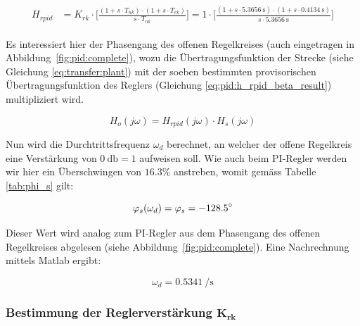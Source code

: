 \begin{gather} \label{eq:pid:h_rpid_beta_result}
    \begin{split}
        H_{rpid} & = K_{rk} \cdot \biggl[ \frac{(1 + s \cdot T_{nk}               ) \cdot (1 + s \cdot T_{vk}               ) }{ s \cdot T_{nk}               } \biggr]
                   = 1      \cdot \biggl[ \frac{(1 + s \cdot \SI{5.3656}{\second} ) \cdot (1 + s \cdot \SI{0.4134}{\second} ) }{ s \cdot \SI{5.3656}{\second} } \biggr]
    \end{split}
\end{gather}


Es interessiert hier der Phasengang des offenen Regelkreises (auch eingetragen
in   Abbildung~\ref{fig:pid:complete}),    wozu   die   \"Ubertragungsfunktion
der  Strecke   (siehe  Gleichung   \ref{eq:transfer:plant})  mit   der  soeben
bestimmten  provisorischen   \"Ubertragungsfunktion  des   Reglers  (Gleichung
\ref{eq:pid:h_rpid_beta_result}) multipliziert wird.

\begin{equation} \label{eq:pid:h_o_k_rk_one}
    H_{o}(j\omega) = H_{rpid}(j\omega) \cdot H_s(j\omega)
\end{equation}

Nun wird die  Durchtrittsfrequenz $\omega_d$ berechnet, an  welcher der offene
Regelkreis eine  Verst\"arkung von $\SI{0}{\decibel} =  1$ aufweisen soll. Wie
auch  beim  PI-Regler  werden  wir   hier  ein  \"Uberschwingen  von  $16.3\%$
anstreben, womit gem\"ass Tabelle \ref{tab:phi_s} gilt:

\begin{equation} \label{eq:pid:omega_d_target}
    \varphi_s(\omega_d) = \varphi_s = -128.5\degree
\end{equation}

Dieser   Wert   wird   analog   zum   PI-Regler   aus   dem   Phasengang   des
offenen Regelkreises  abgelesen (siehe Abbildung~\ref{fig:pid:complete}). Eine
Nachrechnung mittels Matlab ergibt:

\begin{equation} \label{eq:pid:omega_d_target}
    \omega_d = \SI{0.5341}{\per\second}
\end{equation}


\subsubsection{Bestimmung der Reglerverst\"arkung $\mathbf{K_{rk}}$}

